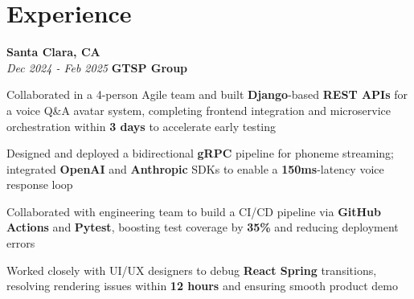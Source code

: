 \section{Experience}

\begin{twocolentry}{
    \textbf{Santa Clara, CA} \\
    \textit{Dec 2024 - Feb 2025}
}{
    \textbf{GTSP Group} \\
}
\end{twocolentry}
\begin{onecolentry}
    \begin{highlights}
        \item Collaborated in a 4-person Agile team and built \textbf{Django}-based \textbf{REST APIs} for a voice Q\&A avatar system, completing frontend integration and microservice orchestration within \textbf{3 days} to accelerate early testing
        \item Designed and deployed a bidirectional \textbf{gRPC} pipeline for phoneme streaming; integrated \textbf{OpenAI} and \textbf{Anthropic} SDKs to enable a \textbf{150ms}-latency voice response loop
        \item Collaborated with engineering team to build a CI/CD pipeline via \textbf{GitHub Actions} and \textbf{Pytest}, boosting test coverage by \textbf{35\%} and reducing deployment errors
        \item Worked closely with UI/UX designers to debug \textbf{React Spring} transitions, resolving rendering issues within \textbf{12 hours} and ensuring smooth product demo
    \end{highlights}
\end{onecolentry}

\vspace{0.2cm}

